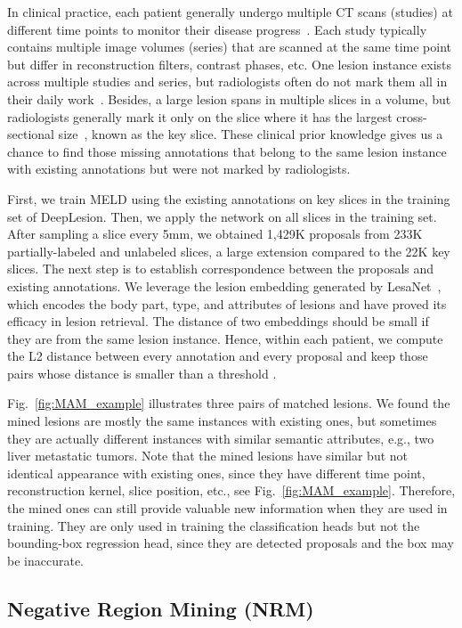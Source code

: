 \documentclass[runningheads]{llncs}
\def\Fig#1{{Fig.~\ref{fig:#1}}}
\def\eg{{e.g.}}
\begin{document}
In clinical practice, each patient generally undergo multiple CT scans (studies) at different time points to monitor their disease progress~\cite{Eisenhauer2009RECIST,Yan2018DeepLesion}. Each study typically contains multiple image volumes (series) that are scanned at the same time point but differ in reconstruction filters, contrast phases, etc. One lesion instance exists across multiple studies and series, but radiologists often do not mark them all in their daily work~\cite{Yan2018graph}. Besides, a large lesion spans in multiple slices in a volume, but radiologists generally mark it only on the slice where it has the largest cross-sectional size~\cite{Eisenhauer2009RECIST}, known as the key slice. These clinical prior knowledge gives us a chance to find those missing annotations that belong to the same lesion instance with existing annotations but were not marked by radiologists.

First, we train MELD using the existing annotations on key slices in the training set of DeepLesion. Then, we apply the network on all slices in the training set. After sampling a slice every 5mm, we obtained 1,429K proposals from 233K partially-labeled and unlabeled slices, a large extension compared to the 22K key slices. The next step is to establish correspondence between the proposals and existing annotations. We leverage the lesion embedding generated by LesaNet~\cite{Yan2019Lesa}, which encodes the body part, type, and attributes of lesions and have proved its efficacy in lesion retrieval. The distance of two embeddings should be small if they are from the same lesion instance. Hence, within each patient, we compute the L2 distance between every annotation and every proposal and keep those pairs whose distance is smaller than a threshold .

\Fig{MAM_example} illustrates three pairs of matched lesions. We found the mined lesions are mostly the same instances with existing ones, but sometimes they are actually different instances with similar semantic attributes, \eg, two liver metastatic tumors. Note that the mined lesions have similar but not identical appearance with existing ones, since they have different time point, reconstruction kernel, slice position, etc., see \Fig{MAM_example}. Therefore, the mined ones can still provide valuable new information when they are used in training. They are only used in training the classification heads but not the bounding-box regression head, since they are detected proposals and the box may be inaccurate.

\subsection{Negative Region Mining (NRM)}
\label{subsec:NRM}
\end{document}
